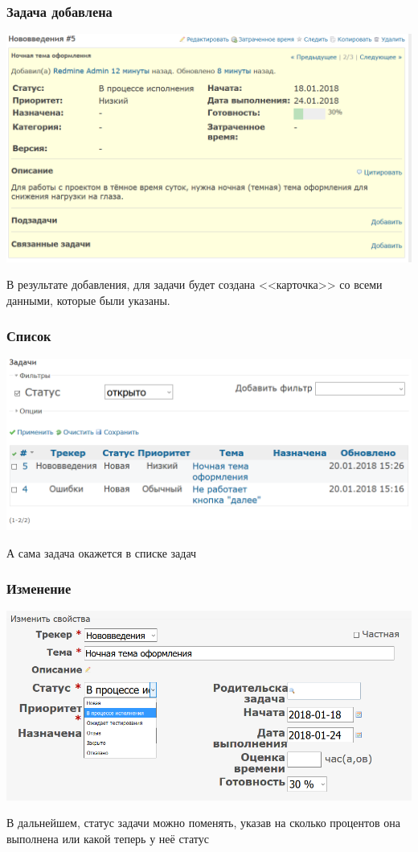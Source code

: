 \documentclass{../industrial-development}
\begin{document}
\begin{frame} \frametitle{Задача добавлена}
\centerline{\includegraphics[width=\textwidth]{status.png}}
\end{frame}
\lecturenotes
В результате добавления, для задачи будет создана <<карточка>> со всеми данными, которые были указаны.

\begin{frame} \frametitle{Список}
\centerline{\includegraphics[width=\textwidth]{list.png}}
\end{frame}
\lecturenotes
А сама задача окажется в списке задач

\begin{frame} \frametitle{Изменение}
\centerline{\includegraphics[width=\textwidth]{changing.png}}
\end{frame}
\lecturenotes
В дальнейшем, статус задачи можно поменять, указав на сколько процентов она выполнена или какой теперь у неё статус
\end{document}
